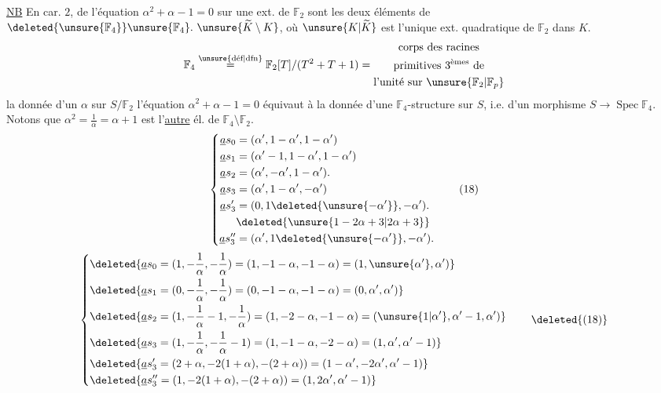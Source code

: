 \uline{NB} En car. $2$,  de l'équation $\alpha^2+\alpha-1=0$ sur une ext.  de $\mathbb{F}_2$ sont les deux éléments de $\deleted{\unsure{\mathbb{F}_4}}\unsure{\mathbb{F}_4}.\ \unsure{\widetilde{K}\setminus K}$, où $\unsure{K|\widetilde{K}}$ est l'unique ext. quadratique de $\mathbb{F}_2$ dans $K$. 
\[
\mathbb{F}_4\overset{\unsure{\text{déf}|\text{dfn}}}{=}\mathbb{F}_2[T]/(T^2+T+1)=\begin{gathered}\text{corps des racines}\\\text{primitives }3^{\text{èmes}}\text{ de}\\\text{l'unité sur }\unsure{\mathbb{F}_2|\mathbb{F}_p}\end{gathered}
\]
la donnée d'un $\alpha$ sur $S/\mathbb{F}_2$  l'équation $\alpha^2+\alpha-1=0$ équivaut à la donnée d'une $\mathbb{F}_4$-structure sur $S$, i.e. d'un morphisme $S\longrightarrow\operatorname{Spec}\mathbb{F}_4$. Notons que $\alpha^2=\frac1\alpha=\alpha+1$ est l'\uline{autre} él. de $\mathbb{F}_4\setminus\mathbb{F}_2$.
\[
\left\{\begin{aligned}
\underline a s_0&=(\alpha',1-\alpha',1-\alpha')\\
\underline a s_1&=(\alpha'-1,1-\alpha',1-\alpha')\\
\underline a s_2&=(\alpha',-\alpha',1-\alpha').\\
\underline a s_3&=(\alpha',1-\alpha',-\alpha')\\
\underline a s_3'&=(0,1\deleted{\unsure{-\alpha'}},-\alpha').\\
&\deleted{\unsure{1-2\alpha+3|2\alpha+3}}\\
\underline a s_3''&=(\alpha',1\deleted{\unsure{-\alpha'}},-\alpha').
\end{aligned}\right.
\tag*{(18)}
\]
\[
\left\{\begin{aligned}
&\deleted{\underline a s_0=(1,-\frac1\alpha,-\frac1\alpha)=(1,-1-\alpha,-1-\alpha)=(1,\unsure{\alpha'},\alpha')}\\
&\deleted{\underline a s_1=(0,-\frac1\alpha,-\frac1\alpha)=(0,-1-\alpha,-1-\alpha)=(0,\alpha',\alpha')}\\
&\deleted{\underline a s_2=(1,-\frac1\alpha-1,-\frac1\alpha)=(1,-2-\alpha,-1-\alpha)=(\unsure{1|\alpha'},\alpha'-1,\alpha')}\\
&\deleted{\underline a s_3=(1,-\frac1\alpha,-\frac1\alpha-1)=(1,-1-\alpha,-2-\alpha)=(1,\alpha',\alpha'-1)}\\
&\deleted{\underline a s_3'=(2+\alpha,-2(1+\alpha),-(2+\alpha))=(1-\alpha',-2\alpha',\alpha'-1)}\\
&\deleted{\underline a s_3''=(1,-2(1+\alpha),-(2+\alpha))=(1,2\alpha',\alpha'-1)}
\end{aligned}\right.
\tag*{\deleted{(18)}}
\]

